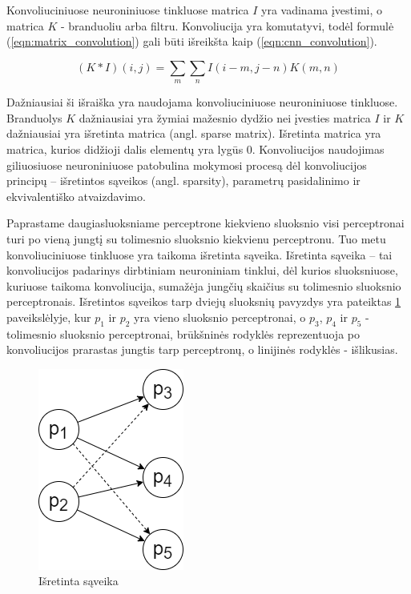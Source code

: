 Konvoliuciniuose neuroniniuose tinkluose matrica $I$ yra vadinama įvestimi, o matrica $K$ - branduoliu arba filtru. Konvoliucija yra komutatyvi, todėl formulė (\ref{eqn:matrix_convolution}) gali būti išreikšta kaip (\ref{eqn:cnn_convolution}).

\begin{equation}
\label{eqn:cnn_convolution}
	(K * I)(i, j) = \sum_{m} \sum_{n} I(i - m, j - n) K(m, n)
\end{equation}

Dažniausiai ši išraiška yra naudojama konvoliuciniuose neuroniniuose tinkluose. Branduolys $K$ dažniausiai yra žymiai mažesnio dydžio nei įvesties matrica $I$ ir $K$ dažniausiai yra išretinta matrica (angl. sparse matrix). Išretinta matrica yra matrica, kurios didžioji dalis elementų yra lygūs 0. Konvoliucijos naudojimas giliuosiuose neuroniniuose patobulina mokymosi procesą dėl konvoliucijos principų -- išretintos sąveikos (angl. sparsity), parametrų pasidalinimo ir ekvivalentiško atvaizdavimo.

Paprastame daugiasluoksniame perceptrone kiekvieno sluoksnio visi perceptronai turi po vieną jungtį su tolimesnio sluoksnio kiekvienu perceptronu. Tuo metu konvoliuciniuose tinkluose yra taikoma išretinta sąveika. Išretinta sąveika -- tai konvoliucijos padarinys dirbtiniam neuroniniam tinklui, dėl kurios sluoksniuose, kuriuose taikoma konvoliucija, sumažėja jungčių skaičius su tolimesnio sluoksnio perceptronais. Išretintos sąveikos tarp dviejų sluoksnių pavyzdys yra pateiktas \ref{img:sparsity} paveikslėlyje, kur $p_1$ ir $p_2$ yra vieno sluoksnio perceptronai, o $p_3$, $p_4$ ir $p_5$ - tolimesnio sluoksnio perceptronai, brūkšninės rodyklės reprezentuoja po konvoliucijos prarastas jungtis tarp perceptronų, o linijinės rodyklės - išlikusias.

\begin{figure}[H]
	\centering
	\includegraphics[scale=0.5]{img/sparsity.png}
	\caption{Išretinta sąveika}
	\label{img:sparsity}
\end{figure}

